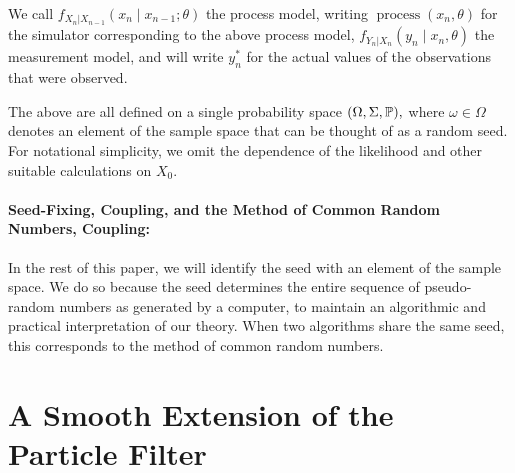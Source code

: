 \documentclass{article}
\begin{document}
We call $f_{X_n|X_{n-1}}\left(x_{n} \mid x_{n-1}; \theta\right)$ the process model, writing $\operatorname{process}\left(x_n, \theta\right)$ for the simulator corresponding to the above process model, $f_{Y_n|X_n}\left(y_n \mid x_n, \theta\right)$ the measurement model, and will write $y_n^*$ for the actual values of the observations that were observed.

The above are all defined on a single probability space $(\Omega, \Sigma, \mathbb{P}),$ where $\omega \in \Omega$ denotes an element of the sample space that can be thought of as a random seed. For notational simplicity, we omit the dependence of the likelihood and other suitable calculations on $X_0.$

\paragraph{Seed-Fixing, Coupling, and the Method of Common Random Numbers, Coupling:}

In the rest of this paper, we will identify the seed with an element of the sample space. We do so because the seed determines the entire sequence of pseudo-random numbers as generated by a computer, to maintain an algorithmic and practical interpretation of our theory. When two algorithms share the same seed, this corresponds to the method of common random numbers. 


\section{A Smooth Extension of the Particle Filter}



\end{document}
